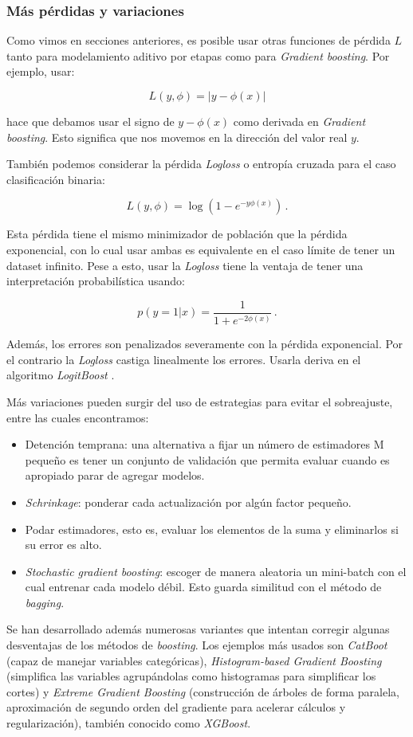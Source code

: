\subsubsection{Más pérdidas y variaciones}

Como vimos en secciones anteriores, es posible usar otras funciones de pérdida $L$ tanto para modelamiento aditivo por etapas como para \textit{Gradient boosting}. Por ejemplo, usar:

$$ L(y,\phi) = |y - \phi(x)| $$

hace que debamos usar el signo de $y - \phi(x)$ como derivada en \textit{Gradient boosting}. Esto significa que nos movemos en la dirección del valor real $y$.

También podemos considerar la pérdida \textit{Logloss} o entropía cruzada para el caso clasificación binaria:

$$ L(y,\phi) = \log(1 - e^{-y\phi(x)}) \,. $$

Esta pérdida tiene el mismo minimizador de población que la pérdida exponencial, con lo cual usar ambas es equivalente en el caso límite de tener un dataset infinito. Pese a esto, usar la \textit{Logloss} tiene la ventaja de tener una  interpretación probabilística usando:

$$ p(y=1|x) = \frac{1}{1+e^{-2\phi(x)}} \,.$$

Además, los errores son penalizados severamente con la pérdida exponencial. Por el contrario la \textit{Logloss} castiga linealmente los errores. Usarla deriva en el algoritmo \textit{LogitBoost} \cite{ESLbook}.

Más variaciones pueden surgir del uso de estrategias para evitar el sobreajuste, entre las cuales encontramos:

\begin{itemize}
    \item Detención temprana: una alternativa a fijar un número de estimadores M pequeño es tener un conjunto de validación que permita evaluar cuando es apropiado parar de agregar modelos.

    \item \textit{Schrinkage}: ponderar cada actualización por algún factor pequeño.

    \item Podar estimadores, esto es, evaluar los elementos de la suma y eliminarlos si su error es alto.

    \item \textit{Stochastic gradient boosting}: escoger de manera aleatoria un mini-batch con el cual entrenar cada modelo débil. Esto guarda similitud con el método de \textit{bagging}.
\end{itemize}

Se han desarrollado además numerosas variantes que intentan corregir algunas desventajas de los métodos de \textit{boosting}. Los ejemplos más usados son \textit{CatBoot} (capaz de manejar variables categóricas), \textit{Histogram-based Gradient Boosting} (simplifica las variables agrupándolas como histogramas para simplificar los cortes) y \textit{Extreme Gradient Boosting} (construcción de árboles de forma paralela, aproximación de segundo orden del gradiente para acelerar cálculos y regularización), también conocido como \textit{XGBoost}.
